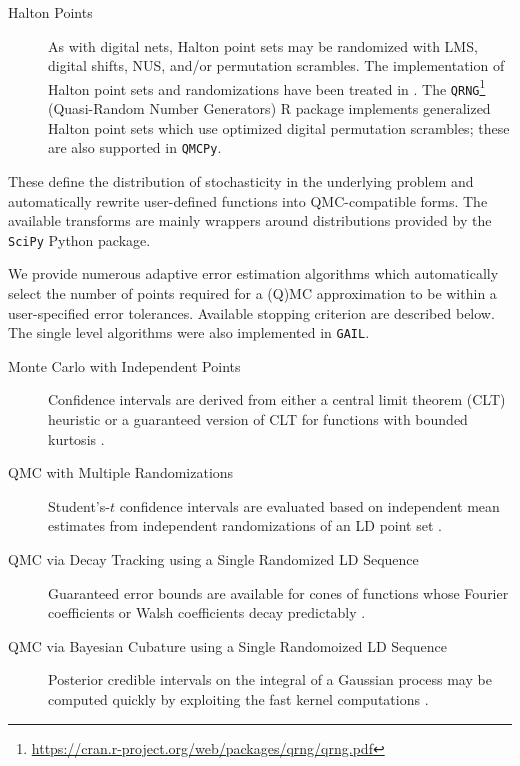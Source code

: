 \documentclass[acmsmall]{acmart}
\begin{document}
\begin{description}
\begin{description}
        \item[Halton Points] As with digital nets, Halton point sets may be randomized with LMS, digital shifts, NUS, and/or permutation scrambles. The implementation of Halton point sets and randomizations have been treated in \citep{owen_halton,wang2000randomized}. The \texttt{QRNG}\footnote{\label{url:qrng}\url{https://cran.r-project.org/web/packages/qrng/qrng.pdf}} (Quasi-Random Number Generators) R package \citep{qrng.software} implements generalized Halton point sets \citep{faure2009generalized} which use optimized digital permutation scrambles; these are also supported in \texttt{QMCPy}.
    \end{description}
    \item[Variable Transformations] These define the distribution of stochasticity in the underlying problem and  automatically rewrite user-defined functions into QMC-compatible forms. The available transforms are mainly wrappers around distributions provided by the \texttt{SciPy} Python package.  
    \item[Error Estimators for (Q)MC and Multilevel (Q)MC] We provide numerous adaptive error estimation algorithms which automatically select the number of points required for a (Q)MC approximation to be within a user-specified error tolerances. Available stopping criterion are described below. The single level algorithms were also implemented in \texttt{GAIL}.
    \begin{description}
        \item[Monte Carlo with Independent Points] Confidence intervals are derived from either a central limit theorem (CLT) heuristic or a guaranteed version of CLT for functions with bounded kurtosis \citep{hickernell.MC_guaranteed_CI}.
        \item[QMC with Multiple Randomizations] Student's-$t$ confidence intervals are evaluated based on independent mean estimates from independent randomizations of an LD point set \cite{l2023confidence}. 
        \item[QMC via Decay Tracking using a Single Randomized LD Sequence] Guaranteed error bounds are available for cones of functions whose Fourier coefficients or Walsh coefficients decay predictably \cite{hickernell.adaptive_dn_cubature,adaptive_qmc,cubqmclattice,ding2018adaptive}. 
        \item[QMC via Bayesian Cubature using a Single Randomoized LD Sequence] Posterior credible intervals on the integral of a Gaussian process may be computed quickly by exploiting the fast kernel computations \citep{rathinavel.bayesian_QMC_lattice,rathinavel.bayesian_QMC_sobol,rathinavel.bayesian_QMC_thesis}.

\end{description}
\end{description}
\end{document}

